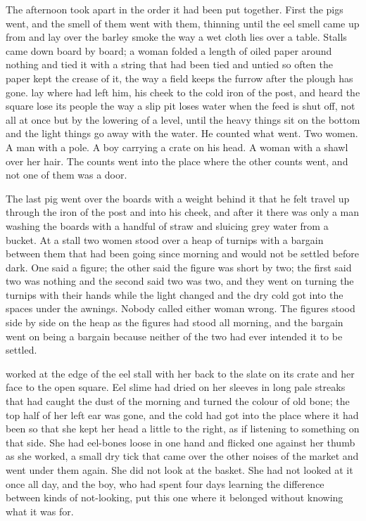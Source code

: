 The afternoon took  apart in the order it had been put together. First the pigs went, and the smell of them went with them, thinning until the eel smell came up from  and lay over the barley smoke the way a wet cloth lies over a table. Stalls came down board by board; a woman folded a length of oiled paper around nothing and tied it with a string that had been tied and untied so often the paper kept the crease of it, the way a field keeps the furrow after the plough has gone.  lay where  had left him, his cheek to the cold iron of the post, and heard the square lose its people the way a slip pit loses water when the feed is shut off, not all at once but by the lowering of a level, until the heavy things sit on the bottom and the light things go away with the water. He counted what went. Two women. A man with a pole. A boy carrying a crate on his head. A woman with a shawl over her hair. The counts went into the place where the other counts went, and not one of them was a door.

The last pig went over the boards with a weight behind it that he felt travel up through the iron of the post and into his cheek, and after it there was only a man washing the boards with a handful of straw and sluicing grey water from a bucket. At a stall two women stood over a heap of turnips with a bargain between them that had been going since morning and would not be settled before dark. One said a figure; the other said the figure was short by two; the first said two was nothing and the second said two was two, and they went on turning the turnips with their hands while the light changed and the dry cold got into the spaces under the awnings. Nobody called either woman wrong. The figures stood side by side on the heap as the figures had stood all morning, and the bargain went on being a bargain because neither of the two had ever intended it to be settled.

 worked at the edge of the eel stall with her back to the slate on its crate and her face to the open square. Eel slime had dried on her sleeves in long pale streaks that had caught the dust of the morning and turned the colour of old bone; the top half of her left ear was gone, and the cold had got into the place where it had been so that she kept her head a little to the right, as if listening to something on that side. She had eel-bones loose in one hand and flicked one against her thumb as she worked, a small dry tick that came over the other noises of the market and went under them again. She did not look at the basket. She had not looked at it once all day, and the boy, who had spent four days learning the difference between kinds of not-looking, put this one where it belonged without knowing what it was for.

